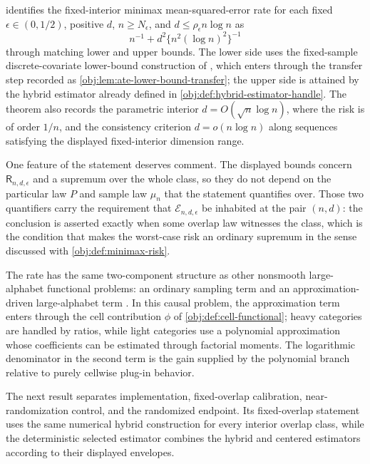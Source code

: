  identifies the fixed-interior minimax mean-squared-error rate for each fixed \(\epsilon\in(0,1/2)\), positive \(d\), \(n\ge N_\epsilon\), and \(d\le\rho_\epsilon n\log n\) as
\[
n^{-1}+d^2\{n^2(\log n)^2\}^{-1}
\]
through matching lower and upper bounds. The lower side uses the fixed-sample discrete-covariate lower-bound construction of \citet{ZengBalakrishnanHanKennedy2024}, which enters through the transfer step recorded as \cref{obj:lem:ate-lower-bound-transfer}; the upper side is attained by the hybrid estimator already defined in \cref{obj:def:hybrid-estimator-handle}. The theorem also records the parametric interior \(d=O(\sqrt n\log n)\), where the risk is of order \(1/n\), and the consistency criterion \(d=o(n\log n)\) along sequences satisfying the displayed fixed-interior dimension range.

One feature of the statement deserves comment. The displayed bounds concern \(\mathsf R_{n,d,\epsilon}\) and a supremum over the whole class, so they do not depend on the particular law \(P\) and sample law \(\mu_n\) that the statement quantifies over. Those two quantifiers carry the requirement that \(\mathcal E_{n,d,\epsilon}\) be inhabited at the pair \((n,d)\): the conclusion is asserted exactly when some overlap law witnesses the class, which is the condition that makes the worst-case risk an ordinary supremum in the sense discussed with \cref{obj:def:minimax-risk}.

The rate has the same two-component structure as other nonsmooth large-alphabet functional problems: an ordinary sampling term and an approximation-driven large-alphabet term \citep{JiaoVenkatHanWeissman2015,WuYang2016,HanJiaoWeissman2020}. In this causal problem, the approximation term enters through the cell contribution \(\phi\) of \cref{obj:def:cell-functional}; heavy categories are handled by ratios, while light categories use a polynomial approximation whose coefficients can be estimated through factorial moments. The logarithmic denominator in the second term is the gain supplied by the polynomial branch relative to purely cellwise plug-in behavior.

The next result separates implementation, fixed-overlap calibration, near-randomization control, and the randomized endpoint. Its fixed-overlap statement uses the same numerical hybrid construction for every interior overlap class, while the deterministic selected estimator combines the hybrid and centered estimators according to their displayed envelopes.

